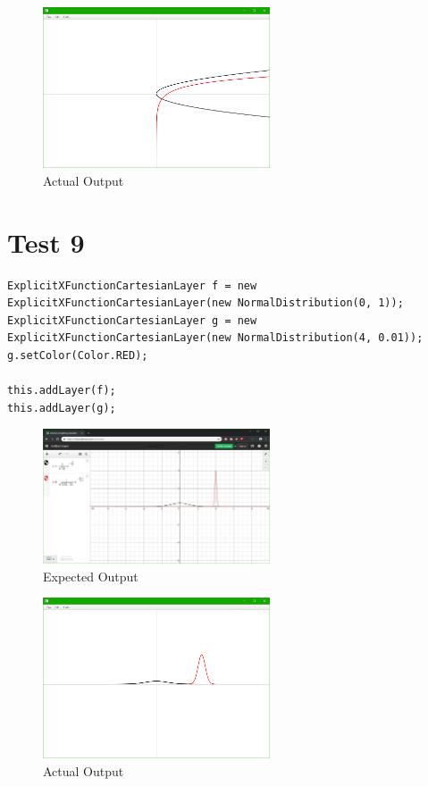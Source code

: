 \documentclass[../../../main.tex]{subfiles}
\begin{document}
\begin{figure}[H]
	\centering
	\includegraphics[width=0.6\textwidth]{tests/actual8}
	\caption{Actual Output}
\end{figure}
\newpage

\section{Test 9}
\begin{verbatim}
ExplicitXFunctionCartesianLayer f = new ExplicitXFunctionCartesianLayer(new NormalDistribution(0, 1));
ExplicitXFunctionCartesianLayer g = new ExplicitXFunctionCartesianLayer(new NormalDistribution(4, 0.01));
g.setColor(Color.RED);

this.addLayer(f);
this.addLayer(g);
\end{verbatim}

\begin{figure}[H]
	\centering
	\includegraphics[width=0.6\textwidth]{tests/expected9}
	\caption{Expected Output}
\end{figure}

\begin{figure}[H]
	\centering
	\includegraphics[width=0.6\textwidth]{tests/actual9}
	\caption{Actual Output}
\end{figure}
\newpage
\end{document}
